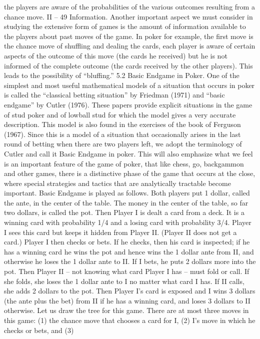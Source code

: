 the players are aware of the probabilities of the various outcomes resulting from a chance
move.
II – 49
Information. Another important aspect we must consider in studying the extensive
form of games is the amount of information available to the players about past moves of
the game. In poker for example, the first move is the chance move of shuffling and dealing
the cards, each player is aware of certain aspects of the outcome of this move (the cards he
received) but he is not informed of the complete outcome (the cards received by the other
players). This leads to the possibility of “bluffing.”
5.2 Basic Endgame in Poker. One of the simplest and most useful mathematical
models of a situation that occurs in poker is called the “classical betting situation” by
Friedman (1971) and “basic endgame” by Cutler (1976). These papers provide explicit
situations in the game of stud poker and of lowball stud for which the model gives a very
accurate description. This model is also found in the exercises of the book of Ferguson
(1967). Since this is a model of a situation that occasionally arises in the last round of
betting when there are two players left, we adopt the terminology of Cutler and call it
Basic Endgame in poker. This will also emphasize what we feel is an important feature of
the game of poker, that like chess, go, backgammon and other games, there is a distinctive
phase of the game that occurs at the close, where special strategies and tactics that are
analytically tractable become important.
Basic Endgame is played as follows. Both players put 1 dollar, called the ante, in the
center of the table. The money in the center of the table, so far two dollars, is called the
pot. Then Player I is dealt a card from a deck. It is a winning card with probability 1/4
and a losing card with probability 3/4. Player I sees this card but keeps it hidden from
Player II. (Player II does not get a card.) Player I then checks or bets. If he checks, then
his card is inspected; if he has a winning card he wins the pot and hence wins the 1 dollar
ante from II, and otherwise he loses the 1 dollar ante to II. If I bets, he puts 2 dollars more
into the pot. Then Player II – not knowing what card Player I has – must fold or call. If
she folds, she loses the 1 dollar ante to I no matter what card I has. If II calls, she adds 2
dollars to the pot. Then Player I’s card is exposed and I wins 3 dollars (the ante plus the
bet) from II if he has a winning card, and loses 3 dollars to II otherwise.
Let us draw the tree for this game. There are at most three moves in this game: (1)
the chance move that chooses a card for I, (2) I’s move in which he checks or bets, and (3)
